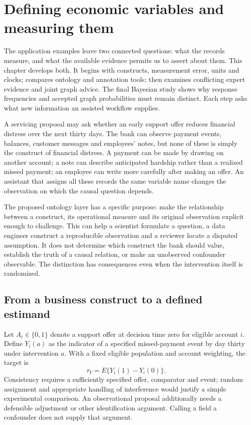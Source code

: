 \chapter{Defining economic variables and measuring them}
\label{exec17:ontology}

The application examples leave two connected questions: what the records
measure, and what the available evidence permits us to assert about them.
This chapter develops both. It begins with constructs, measurement error,
units and clocks; compares ontology and annotation tools; then examines
conflicting expert evidence and joint graph advice. The final Bayesian study
shows why response frequencies and accepted graph probabilities must remain
distinct. Each step asks what new information an assisted workflow supplies.

A servicing proposal may ask whether an early support offer reduces financial
distress over the next thirty days. The bank can observe payment events,
balances, customer messages and employees' notes, but none of these is simply
the construct of financial distress. A payment can be made by drawing on
another account; a note can describe anticipated hardship rather than a
realized missed payment; an employee can write more carefully after making an
offer. An assistant that assigns all these records the same variable name
changes the observation on which the causal question depends.

The proposed ontology layer has a specific purpose: make the relationship
between a construct, its operational measure and its original observation
explicit enough to challenge. This can help a scientist formulate a question,
a data engineer construct a reproducible observation and a reviewer locate a
disputed assumption. It does not determine which construct the bank should
value, establish the truth of a causal relation, or make an unobserved
confounder observable. The distinction has consequences even when the
intervention itself is randomized.

\section{From a business construct to a defined estimand}

Let \(A_i\in\{0,1\}\) denote a support offer at decision time zero for eligible
account \(i\). Define \(Y_i(a)\) as the indicator of a specified missed-payment
event by day thirty under intervention \(a\). With a fixed eligible population
and account weighting, the target is
\[
 \tau_Y=E\{Y_i(1)-Y_i(0)\}.
\]
Consistency requires a sufficiently specified offer, comparator and event;
random assignment and appropriate handling of interference would justify a
simple experimental comparison. An observational proposal additionally needs
a defensible adjustment or other identification argument. Calling a field a
confounder does not supply that argument.

